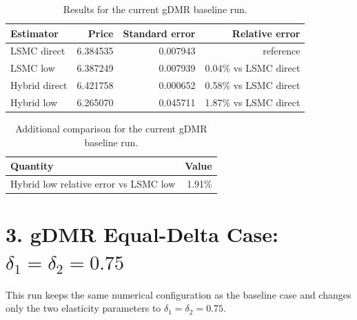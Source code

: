 \documentclass[11pt]{article}
\begin{document}
\begin{table}[htbp]
\centering
\caption{Results for the current gDMR baseline run.}
\begin{tabular}{lrrr}
\toprule
Estimator & Price & Standard error & Relative error \\
\midrule
LSMC direct   & 6.384535 & 0.007943 & reference \\
LSMC low      & 6.387249 & 0.007939 & 0.04\% vs LSMC direct \\
Hybrid direct & 6.421758 & 0.000652 & 0.58\% vs LSMC direct \\
Hybrid low    & 6.265070 & 0.045711 & 1.87\% vs LSMC direct \\
\bottomrule
\end{tabular}
\end{table}

\begin{table}[htbp]
\centering
\caption{Additional comparison for the current gDMR baseline run.}
\begin{tabular}{lr}
\toprule
Quantity & Value \\
\midrule
Hybrid low relative error vs LSMC low & 1.91\% \\
\bottomrule
\end{tabular}
\end{table}

\section*{3. gDMR Equal-Delta Case: $\delta_1=\delta_2=0.75$}

This run keeps the same numerical configuration as the baseline case and changes only the two
elasticity parameters to $\delta_1=\delta_2=0.75$.
\end{document}
